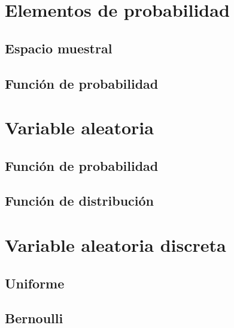 \documentclass[
]{book}
\begin{document}
\hypertarget{elementos-de-probabilidad}{%
\section{Elementos de probabilidad}\label{elementos-de-probabilidad}}

\hypertarget{espacio-muestral}{%
\subsection{Espacio muestral}\label{espacio-muestral}}

\hypertarget{funciuxf3n-de-probabilidad}{%
\subsection{Función de probabilidad}\label{funciuxf3n-de-probabilidad}}

\hypertarget{variable-aleatoria}{%
\section{Variable aleatoria}\label{variable-aleatoria}}

\hypertarget{funciuxf3n-de-probabilidad-1}{%
\subsection{Función de probabilidad}\label{funciuxf3n-de-probabilidad-1}}

\hypertarget{funciuxf3n-de-distribuciuxf3n}{%
\subsection{Función de distribución}\label{funciuxf3n-de-distribuciuxf3n}}

\hypertarget{variable-aleatoria-discreta}{%
\section{Variable aleatoria discreta}\label{variable-aleatoria-discreta}}

\hypertarget{uniforme}{%
\subsection{Uniforme}\label{uniforme}}

\hypertarget{bernoulli}{%
\subsection{Bernoulli}\label{bernoulli}}
\end{document}
